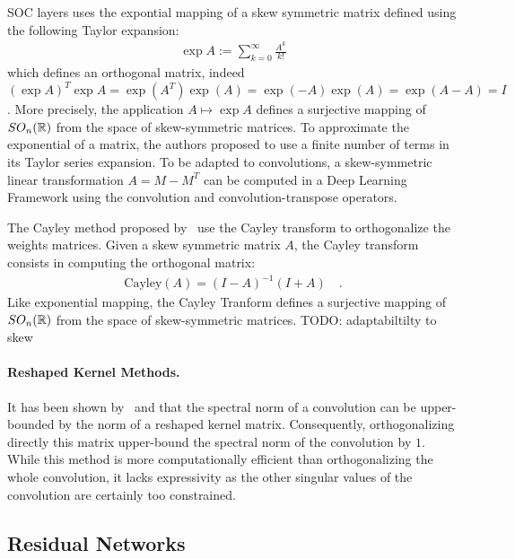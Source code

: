 SOC layers uses the expontial mapping of a skew symmetric matrix defined using the following Taylor expansion:
\begin{align*}
  \exp{A}:=\sum_{k=0}^{\infty}\frac{A^k}{k!}
\end{align*}
which defines an orthogonal matrix, indeed $(\exp{A})^T\exp{A} = \exp(A^T)\exp(A) = \exp(-A)\exp(A) = \exp(A-A)=I$ . More precisely, the application $A\mapsto\exp{A}$ defines a surjective mapping of $SO_n(\mathbb{R})$ from the space of skew-symmetric matrices. To approximate the exponential of a matrix, the authors proposed to use a finite number of terms in its Taylor series expansion.  To be adapted to convolutions, a skew-symmetric linear transformation $A = M-M^T$ can be  computed in a Deep Learning Framework using the  convolution and convolution-transpose operators.



The Cayley method proposed by~\citet{trockman2021orthogonalizing} use the Cayley transform to orthogonalize the weights matrices. Given a skew symmetric matrix $A$, the Cayley transform consists in computing the orthogonal matrix:
\begin{align*}
   \text{Cayley}(A)= (I - A)^{-1} (I + A) \quad.
\end{align*}
Like exponential mapping, the Cayley Tranform defines  a surjective mapping of $SO_n(\mathbb{R})$ from the space of skew-symmetric matrices. TODO: adaptabiltilty to skew

\paragraph{Reshaped Kernel Methods.}
It has been shown by~\citet{cisse2017parseval} and \citet{tsuzuku2018lipschitz} that the spectral norm of a convolution can be upper-bounded by the norm of a reshaped kernel matrix. Consequently, orthogonalizing directly this matrix upper-bound the spectral norm of the convolution by $1$.
While this method is more computationally efficient than orthogonalizing the whole convolution, it lacks expressivity as the other singular values of the convolution are certainly too constrained. 



\subsection{Residual Networks}


